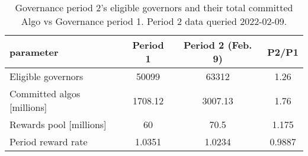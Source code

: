%
\begin{longtable}[c]{ l c c c }
\caption{Governance period 2's eligible governors and their total committed Algo vs Governance period 1. Period 2 data queried 2022-02-09.} \\
\hline
\textbf{parameter} & \textbf{Period 1} & \textbf{Period 2 (Feb. 9)} & \textbf{P2/P1} \\
\hline

Eligible governors & 50099 & 63312 & 1.26 \\
Committed algos [millions] & 1708.12 & 3007.13 & 1.76 \\
Rewards pool [millions] & 60 & 70.5 & 1.175 \\
Period reward rate & 1.0351 & 1.0234 & 0.9887 \\
\hline
\end{longtable} 
